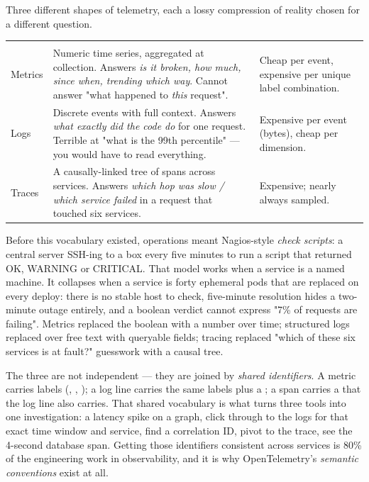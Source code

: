 
 Three different shapes of telemetry, each a lossy compression of reality chosen for a different question.

\begin{center}\small
\wbrowcolors
\begin{tabularx}{\linewidth}{@{}L{20mm} X L{28mm}@{}}
 &  & \\
Metrics & Numeric time series, aggregated at collection. Answers \emph{is it broken, how much, since when, trending which way}. Cannot answer "what happened to \emph{this} request". & Cheap per event, expensive per unique label combination.\\
Logs & Discrete events with full context. Answers \emph{what exactly did the code do} for one request. Terrible at "what is the 99th percentile" --- you would have to read everything. & Expensive per event (bytes), cheap per dimension.\\
Traces & A causally-linked tree of spans across services. Answers \emph{which hop was slow / which service failed} in a request that touched six services. & Expensive; nearly always sampled.\\
\end{tabularx}
\end{center}

 Before this vocabulary existed, operations meant Nagios-style \emph{check scripts}: a central server SSH-ing to a box every five minutes to run a script that returned OK, WARNING or CRITICAL. That model works when a service is a named machine. It collapses when a service is forty ephemeral pods that are replaced on every deploy: there is no stable host to check, five-minute resolution hides a two-minute outage entirely, and a boolean verdict cannot express "7\% of requests are failing". Metrics replaced the boolean with a number over time; structured logs replaced  over free text with queryable fields; tracing replaced "which of these six services is at fault?" guesswork with a causal tree.

 The three are not independent --- they are joined by \emph{shared identifiers}. A metric carries labels (, , ); a log line carries the same labels plus a ; a span carries a  that the log line also carries. That shared vocabulary is what turns three tools into one investigation: a latency spike on a graph, click through to the logs for that exact time window and service, find a correlation ID, pivot to the trace, see the 4-second database span. Getting those identifiers consistent across services is 80\% of the engineering work in observability, and it is why OpenTelemetry's \emph{semantic conventions} exist at all.


